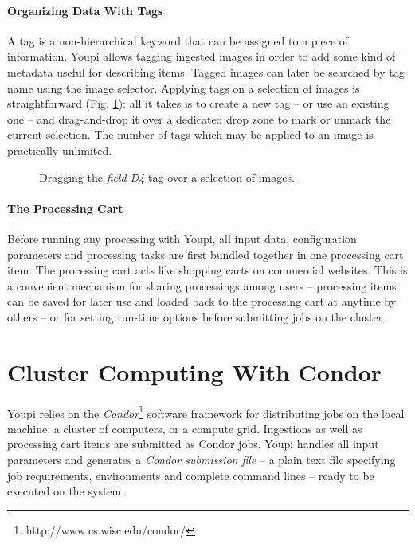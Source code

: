 \documentclass[11pt,twoside]{article}  %
\begin{document}
\paragraph{Organizing Data With Tags}

A tag is a non-hierarchical keyword that can be assigned to a piece of information. Youpi allows 
tagging ingested images in order to add some kind of metadata useful for describing items. Tagged 
images can later be searched by tag name using the image selector. Applying tags on a selection of 
images is straightforward (Fig. \ref{fig:tags}): all it takes is to create a new tag -- or use
an existing one -- and drag-and-drop it over a dedicated drop zone to mark or unmark the current
selection. The number of tags which may be applied to an image is practically unlimited.

\begin{figure}[h]
\caption{Dragging the \emph{field-D4} tag over a selection of images.}\label{fig:tags}
\end{figure}

\paragraph{The Processing Cart}

Before running any processing with Youpi, all input data, configuration parameters and processing 
tasks are first bundled together in one processing cart item. The processing cart acts like shopping 
carts on commercial websites. This is a convenient mechanism for sharing processings among users -- 
processing items can be saved for later use and loaded back to the processing cart at 
anytime by others -- or for setting run-time options before submitting jobs on the cluster.

\section{Cluster Computing With Condor}

Youpi relies on the \emph{Condor}\footnote{http://www.cs.wisc.edu/condor/} software framework
for distributing jobs on the local machine, a cluster of computers, or a compute grid.
Ingestions as well as processing cart items are submitted as Condor jobs. Youpi handles all 
input parameters and generates a \emph{Condor submission file} -- a plain text file specifying 
job requirements, environments and complete command lines -- ready to be executed on the system.
\end{document}
